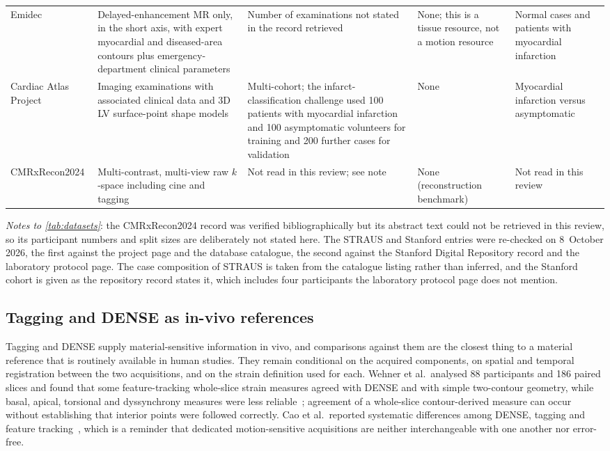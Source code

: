 \begin{longtable}{@{}L{0.17\textwidth}L{0.19\textwidth}L{0.20\textwidth}L{0.17\textwidth}L{0.18\textwidth}@{}}
Emidec~\citep{lalande2020emidec} & Delayed-enhancement MR only, in the short axis, with expert myocardial and diseased-area contours plus emergency-department clinical parameters & Number of examinations not stated in the record retrieved & None; this is a tissue resource, not a motion resource & Normal cases and patients with myocardial infarction\\
Cardiac Atlas Project~\citep{fonseca2011cap,suinesiaputra2018} & Imaging examinations with associated clinical data and 3D LV surface-point shape models & Multi-cohort; the infarct-classification challenge used 100 patients with myocardial infarction and 100 asymptomatic volunteers for training and 200 further cases for validation & None & Myocardial infarction versus asymptomatic\\
CMRxRecon2024 \citep{wang2025cmrxrecon2024} & Multi-contrast, multi-view raw $k$-space including cine and tagging & Not read in this review; see note & None (reconstruction benchmark) & Not read in this review\\
\bottomrule
\end{longtable}

\noindent\emph{Notes to \cref{tab:datasets}}: the CMRxRecon2024 record was verified bibliographically
but its abstract text could not be retrieved in this review, so its participant numbers and split
sizes are deliberately not stated here. The STRAUS and Stanford entries were re-checked on
8~October 2026, the first against the project page and the database catalogue, the second against
the Stanford Digital Repository record and the laboratory protocol page. The case
composition of STRAUS is taken from the catalogue listing rather than inferred, and the Stanford
cohort is given as the repository record states it, which includes four participants the laboratory
protocol page does not mention.

\subsection{Tagging and DENSE as in-vivo references}\label{sec:material}

Tagging and DENSE supply material-sensitive information in vivo, and comparisons against them are
the closest thing to a material reference that is routinely available in human studies. They remain
conditional on the acquired components, on spatial and temporal registration between the two
acquisitions, and on the strain definition used for each. Wehner et al.\ analysed 88 participants and 186 paired slices and found
that some feature-tracking whole-slice strain measures agreed with DENSE and with simple two-contour
geometry, while basal, apical, torsional and dyssynchrony measures were less
reliable~\citep{wehner2018}; agreement of a whole-slice contour-derived measure can occur without
establishing that interior points were followed correctly. Cao et al.\ reported systematic
differences among DENSE, tagging and feature tracking~\citep{cao2018}, which is a reminder that
dedicated motion-sensitive acquisitions are neither interchangeable with one another nor error-free.

